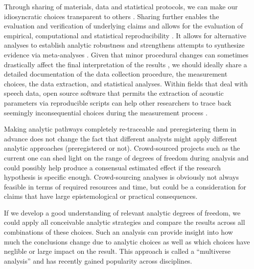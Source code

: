 \documentclass[Review,times,sageh]{sagej}
\begin{document}
Through sharing of materials, data and statistical protocols, we can make our idiosyncratic choices transparent to others \citep{munafo2017manifesto, vazire2017quality}.
Sharing further enables the evaluation and verification of underlying claims and allows for the evaluation of empirical, computational and statistical reproducibility \citep{lebel2018unified}.
It allows for alternative analyses to establish analytic robustness \citep{steegen2016increasing} and strengthens attempts to synthesize evidence via meta-analyses \citep[e.g.,][]{nicenboim2018using}.
Given that minor procedural changes can sometimes drastically affect the final interpretation of the results \citep{breznau2021observing}, we should ideally share a detailed documentation of the data collection procedure, the measurement choices, the data extraction, and statistical analyses.
Within fields that deal with speech data, open source software that permits the extraction of acoustic parameters via reproducible scripts can help other researchers to trace back seemingly inconsequential choices during the measurement process \citetext{\citealp[e.g., Praat:][]{boersma2021praat}; \citealp[EMU:][]{winkelmann2017emu}; \citealp[the Montreal Forced Aligner:][]{mcauliffe2017}}.

Making analytic pathways completely re-traceable and preregistering them in advance does not change the fact that different analysts might apply different analytic approaches (preregistered or not).
Crowd-sourced projects such as the current one can shed light on the range of degrees of freedom during analysis and could possibly help produce a consensual estimated effect if the research hypothesis is specific enough.
Crowd-sourcing analyses is obviously not always feasible in terms of required resources and time, but could be a consideration for claims that have large epistemological or practical consequences.

If we develop a good understanding of relevant analytic degrees of freedom, we could apply all conceivable analytic strategies and compare the results across all combinations of these choices.
Such an analysis can provide insight into how much the conclusions change due to analytic choices as well as which choices have neglible or large impact on the result.
This approach is called a ``multiverse analysis'' \citep[e.g,][]{steegen2016increasing, harder2020multiverse} and has recently gained popularity across disciplines.
\end{document}
